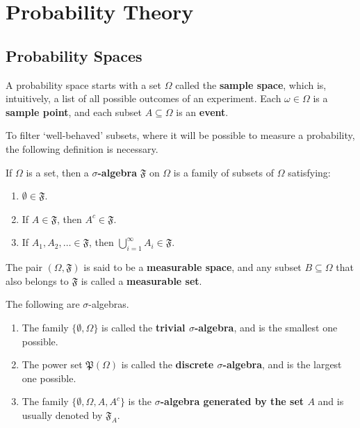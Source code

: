 \chapter{Probability Theory}

\section{Probability Spaces}

A probability space starts with a set $\Omega$ called the \textbf{sample space}, which is, intuitively, a list of all possible outcomes of an experiment. Each $\omega \in \Omega$ is a \textbf{sample point}, and each subset $A \subseteq \Omega$ is an \textbf{event}.

To filter `well-behaved' subsets, where it will be possible to measure a probability, the following definition is necessary.

\begin{definition}
	If $\Omega$ is a set, then a \textbf{$\sigma$-algebra} $\mathfrak{F}$ on $\Omega$ is a family of subsets of $\Omega$ satisfying:
	\begin{enumerate}
		\item $\emptyset \in \mathfrak{F}$.
		\item If $A \in \mathfrak{F}$, then $A^c \in \mathfrak{F}$.
		\item If $A_1, A_2, \ldots \in \mathfrak{F}$, then $\bigcup_{i=1}^\infty A_i \in \mathfrak{F}$.
	\end{enumerate}
	The pair $(\Omega, \mathfrak{F})$ is said to be a \textbf{measurable space}, and any subset $B \subseteq \Omega$ that also belongs to $\mathfrak{F}$ is called a \textbf{measurable set}.
\end{definition}

\begin{example}
	The following are $\sigma$-algebras.
	\begin{enumerate}
		\item The family $\{\emptyset, \Omega\}$ is called the \textbf{trivial $\sigma$-algebra}, and is the smallest one possible.
		\item The power set $\mathfrak{P}(\Omega)$ is called the \textbf{discrete $\sigma$-algebra}, and is the largest one possible.
		\item The family $\{\emptyset, \Omega, A, A^c\}$ is the \textbf{$\sigma$-algebra generated by the set $A$} and is usually denoted by $\mathfrak{F}_A$.
	\end{enumerate}
\end{example}

